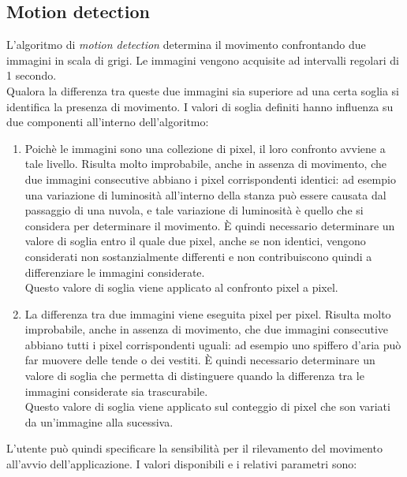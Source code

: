 \subsection{Motion detection}
L'algoritmo di \textit{motion detection} determina il movimento confrontando due immagini in scala di grigi. Le immagini vengono acquisite ad intervalli regolari di 1 secondo.\\
Qualora la differenza tra queste due immagini sia superiore ad una certa soglia si identifica la presenza di movimento. I valori di soglia definiti hanno influenza su due componenti all'interno dell'algoritmo:
\begin{enumerate}
  \item Poichè le immagini sono una collezione di pixel, il loro confronto avviene a tale livello. Risulta molto improbabile, anche in assenza di movimento, che due immagini consecutive abbiano i pixel corrispondenti identici: ad esempio una variazione di luminosità all'interno della stanza può essere causata dal passaggio di una nuvola, e tale variazione di luminosità è quello che si considera per determinare il movimento. \`E quindi necessario determinare un valore di soglia entro il quale due pixel, anche se non identici, vengono considerati non sostanzialmente differenti e non contribuiscono quindi a differenziare le immagini considerate.\\
  Questo valore di soglia viene applicato al confronto pixel a pixel.
  \item La differenza tra due immagini viene eseguita pixel per pixel. Risulta molto improbabile, anche in assenza di movimento, che due immagini consecutive abbiano tutti i pixel corrispondenti uguali: ad esempio uno spiffero d'aria può far muovere delle tende o dei vestiti. \`E quindi necessario determinare un valore di soglia che permetta di distinguere quando la differenza tra le immagini considerate sia trascurabile.\\
  Questo valore di soglia viene applicato sul conteggio di pixel che son variati da un'immagine alla sucessiva.
\end{enumerate}
L'utente può quindi specificare la sensibilità per il rilevamento del movimento all'avvio dell'applicazione. I valori disponibili e i relativi parametri sono:
